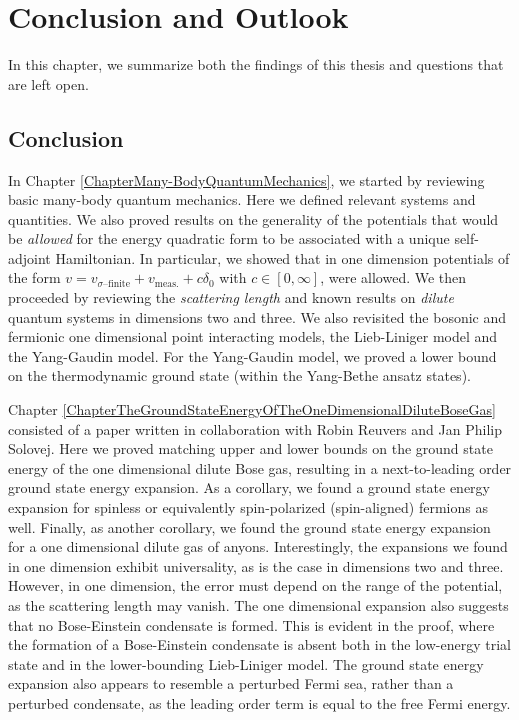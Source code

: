 \chapter{Conclusion and Outlook}
\label{ChapterConclusionAndOutlook}
In this chapter, we summarize both the findings of this thesis and questions that are left open.
\section{Conclusion}
In Chapter \ref{ChapterMany-BodyQuantumMechanics}, we started by reviewing basic many-body quantum mechanics. Here we defined relevant systems and quantities. We also proved results on the generality of the potentials that would be \emph{allowed} for the energy quadratic form to be associated with a unique self-adjoint Hamiltonian. In particular, we showed that in one dimension potentials of the form $ v=v_{\sigma\text{--finite}}+v_{\text{meas.}} +c\delta_0 $ with $ c\in[0,\infty] $, were allowed. We then proceeded by reviewing the \emph{scattering length} and known results on \emph{dilute} quantum systems in dimensions two and three. We also revisited the bosonic and fermionic one dimensional point interacting models, \ie the Lieb-Liniger model and the Yang-Gaudin model.
For the Yang-Gaudin model, we proved a lower bound on the thermodynamic ground state (within the Yang-Bethe ansatz states).

Chapter \ref{ChapterTheGroundStateEnergyOfTheOneDimensionalDiluteBoseGas} consisted of a paper written in collaboration with Robin Reuvers and Jan Philip Solovej. Here we proved matching upper and lower bounds on the ground state energy of the one dimensional dilute Bose gas, resulting in a next-to-leading order ground state energy expansion. As a corollary, we found a ground state energy expansion for spinless or equivalently spin-polarized (spin-aligned) fermions as well. Finally, as another corollary, we found the ground state energy expansion for a one dimensional dilute gas of anyons. Interestingly, the expansions we found in one dimension exhibit universality, as is the case in dimensions two and three. However, in one dimension, the error must depend on the range of the potential, as the scattering length may vanish. The one dimensional expansion also suggests that no Bose-Einstein condensate is formed. This is evident in the proof, where the formation of a Bose-Einstein condensate is absent both in the low-energy trial state and in the lower-bounding Lieb-Liniger model. The ground state energy expansion also appears to resemble a perturbed Fermi sea, rather than a perturbed condensate, as the leading order term is equal to the free Fermi energy.

